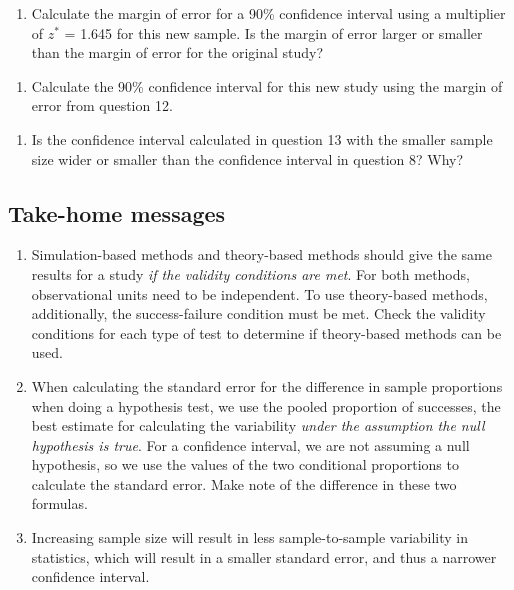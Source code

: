 \documentclass[
]{report}
\providecommand{\tightlist}{%
  \setlength{\itemsep}{0pt}\setlength{\parskip}{0pt}}
\begin{document}
\begin{enumerate}
\def\labelenumi{\arabic{enumi}.}
\setcounter{enumi}{11}
\tightlist
\item
  Calculate the margin of error for a 90\% confidence interval using a multiplier of \(z^*\) = 1.645 for this new sample. Is the margin of error larger or smaller than the margin of error for the original study?
\end{enumerate}

\vspace{.8in}

\begin{enumerate}
\def\labelenumi{\arabic{enumi}.}
\setcounter{enumi}{12}
\tightlist
\item
  Calculate the 90\% confidence interval for this new study using the margin of error from question 12.
\end{enumerate}

\vspace{.8in}

\begin{enumerate}
\def\labelenumi{\arabic{enumi}.}
\setcounter{enumi}{13}
\tightlist
\item
  Is the confidence interval calculated in question 13 with the smaller sample size wider or smaller than the confidence interval in question 8? Why?
\end{enumerate}

\vspace{.8in}

\hypertarget{take-home-messages-14}{%
\subsection{Take-home messages}\label{take-home-messages-14}}

\begin{enumerate}
\def\labelenumi{\arabic{enumi}.}
\item
  Simulation-based methods and theory-based methods should give the same results for a study \emph{if the validity conditions are met}. For both methods, observational units need to be independent. To use theory-based methods, additionally, the success-failure condition must be met. Check the validity conditions for each type of test to determine if theory-based methods can be used.
\item
  When calculating the standard error for the difference in sample proportions when doing a hypothesis test, we use the pooled proportion of successes, the best estimate for calculating the variability \emph{under the assumption the null hypothesis is true}. For a confidence interval, we are not assuming a null hypothesis, so we use the values of the two conditional proportions to calculate the standard error. Make note of the difference in these two formulas.
\item
  Increasing sample size will result in less sample-to-sample variability in statistics, which will result in a smaller standard error, and thus a narrower confidence interval.
\end{enumerate}
\end{document}

